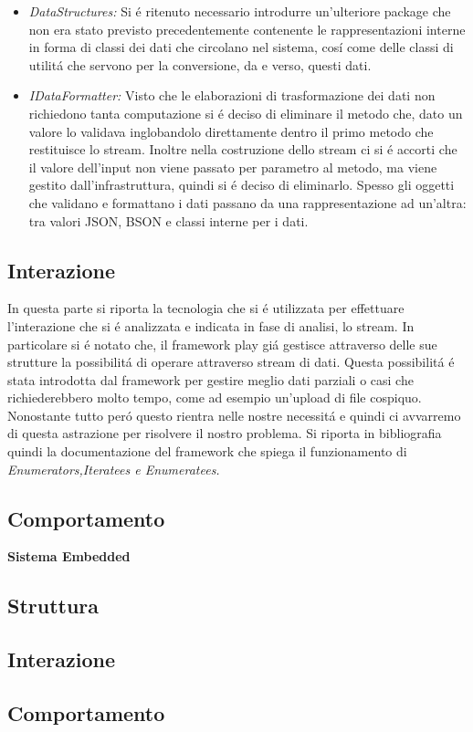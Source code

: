 \begin{itemize}
  \item \textit{DataStructures:} Si \'e ritenuto necessario introdurre un'ulteriore package che non era stato previsto precedentemente contenente le rappresentazioni interne in forma di classi dei dati che circolano nel sistema, cos\'i come delle classi di utilit\'a che servono per la conversione, da e verso, questi dati.
  \item \textit{IDataFormatter:} Visto che le elaborazioni di trasformazione dei dati non richiedono tanta computazione si \'e deciso di eliminare il metodo che, dato un valore lo validava inglobandolo direttamente dentro il primo metodo che restituisce lo stream. Inoltre nella costruzione dello stream ci si \'e accorti che il valore dell'input non viene passato per parametro al metodo, ma viene gestito dall'infrastruttura, quindi si \'e deciso di eliminarlo. Spesso gli oggetti che validano e formattano i dati passano da una rappresentazione ad un'altra: tra valori JSON, BSON e classi interne per i dati.
\end{itemize}

\subsection{Interazione}

In questa parte si riporta la tecnologia che si \'e utilizzata per effettuare l'interazione che si \'e analizzata e indicata in fase di analisi, lo stream. In particolare si \'e notato che, il framework play\cite{PlayFramework} gi\'a gestisce attraverso delle sue strutture la possibilit\'a di operare attraverso stream di dati. Questa possibilit\'a \'e stata introdotta dal framework per gestire meglio dati parziali o casi che richiederebbero molto tempo, come ad esempio un'upload di file cospiquo. Nonostante tutto per\'o questo rientra nelle nostre necessit\'a e quindi ci avvarremo di questa astrazione per risolvere il nostro problema. Si riporta in bibliografia quindi la documentazione del framework che spiega il funzionamento di \textit{Enumerators,Iteratees e Enumeratees.} \cite{PlayStreaming}

\subsection{Comportamento}

\begin{center}
  \textbf{Sistema Embedded}
\end{center}

\subsection{Struttura}
\subsection{Interazione}
\subsection{Comportamento}
